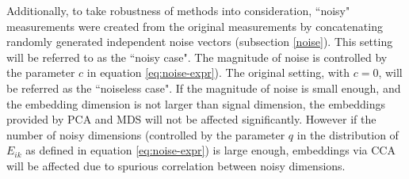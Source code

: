 \documentclass[12pt,oneside,final]{thesis}\usepackage[]{graphicx}\usepackage[]{color}
\begin{document}
 Additionally, to take robustness of methods into consideration, ``noisy" measurements were created from the original measurements by concatenating randomly generated independent noise vectors (subsection \ref{noise}).   This setting will be referred to as the ``noisy case". The magnitude of noise is controlled by the parameter $c$ in equation \eqref{eq:noise-expr}). The original setting, with $c=0$,  will be referred as the ``noiseless case".
If the magnitude of noise is small enough, and the embedding dimension is not larger than signal dimension, the embeddings provided by PCA and MDS will not be affected significantly. However  if the number of noisy dimensions (controlled by the parameter $q$ in the distribution of $E_{ik}$ as defined in equation \eqref{eq:noise-expr}) is large enough, embeddings via  CCA  will be affected due to spurious correlation between noisy dimensions.
\end{document}
